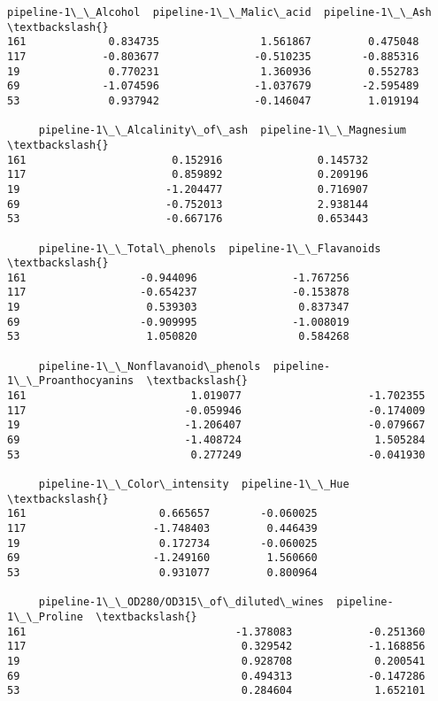 \documentclass[11pt]{article}
\makeatletter
\newcommand{\boxspacing}{\kern\kvtcb@left@rule\kern\kvtcb@boxsep}
\newcommand{\prompt}[4]{
        {\ttfamily\llap{{\color{#2}[#3]:\hspace{3pt}#4}}\vspace{-\baselineskip}}
    }
\makeatother
\begin{document}
            \begin{tcolorbox}[breakable, size=fbox, boxrule=.5pt, pad at break*=1mm, opacityfill=0]
\prompt{Out}{outcolor}{24}{\boxspacing}
\begin{Verbatim}[commandchars=\\\{\}]
     pipeline-1\_\_Alcohol  pipeline-1\_\_Malic\_acid  pipeline-1\_\_Ash  \textbackslash{}
161             0.834735                1.561867         0.475048
117            -0.803677               -0.510235        -0.885316
19              0.770231                1.360936         0.552783
69             -1.074596               -1.037679        -2.595489
53              0.937942               -0.146047         1.019194

     pipeline-1\_\_Alcalinity\_of\_ash  pipeline-1\_\_Magnesium  \textbackslash{}
161                       0.152916               0.145732
117                       0.859892               0.209196
19                       -1.204477               0.716907
69                       -0.752013               2.938144
53                       -0.667176               0.653443

     pipeline-1\_\_Total\_phenols  pipeline-1\_\_Flavanoids  \textbackslash{}
161                  -0.944096               -1.767256
117                  -0.654237               -0.153878
19                    0.539303                0.837347
69                   -0.909995               -1.008019
53                    1.050820                0.584268

     pipeline-1\_\_Nonflavanoid\_phenols  pipeline-1\_\_Proanthocyanins  \textbackslash{}
161                          1.019077                    -1.702355
117                         -0.059946                    -0.174009
19                          -1.206407                    -0.079667
69                          -1.408724                     1.505284
53                           0.277249                    -0.041930

     pipeline-1\_\_Color\_intensity  pipeline-1\_\_Hue  \textbackslash{}
161                     0.665657        -0.060025
117                    -1.748403         0.446439
19                      0.172734        -0.060025
69                     -1.249160         1.560660
53                      0.931077         0.800964

     pipeline-1\_\_OD280/OD315\_of\_diluted\_wines  pipeline-1\_\_Proline  \textbackslash{}
161                                 -1.378083            -0.251360
117                                  0.329542            -1.168856
19                                   0.928708             0.200541
69                                   0.494313            -0.147286
53                                   0.284604             1.652101


\end{Verbatim}
\end{tcolorbox}
\end{document}
